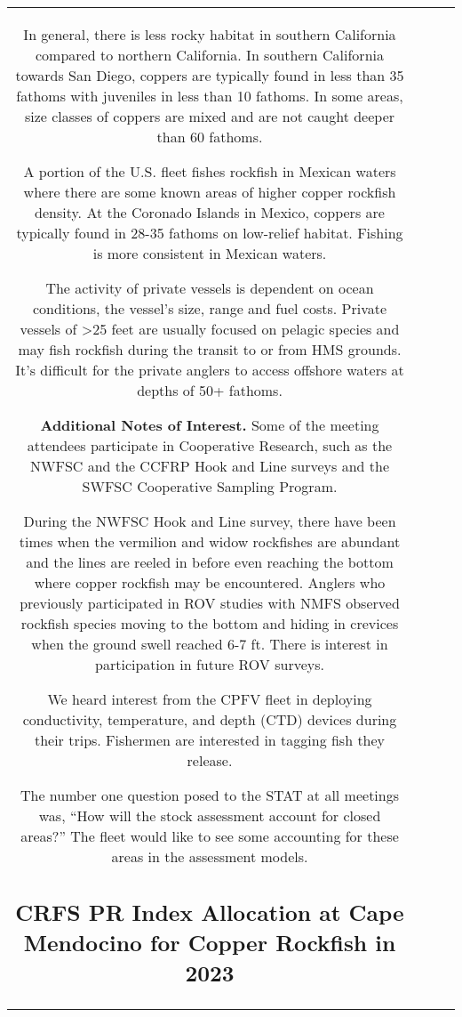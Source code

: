 \documentclass[11pt,
  letterpaper,
]{article}
\begin{document}
\begin{longtable}[t]{c>{\centering\arraybackslash}p{2cm}>{\centering\arraybackslash}p{2cm}>{\centering\arraybackslash}p{2cm}}
In general, there is less rocky habitat in southern California compared to northern California. In southern California towards San Diego, coppers are typically found in less than 35 fathoms with juveniles in less than 10 fathoms. In some areas, size classes of coppers are mixed and are not caught deeper than 60 fathoms.

A portion of the U.S. fleet fishes rockfish in Mexican waters where there are some known areas of higher copper rockfish density. At the Coronado Islands in Mexico, coppers are typically found in 28-35 fathoms on low-relief habitat. Fishing is more consistent in Mexican waters.

The activity of private vessels is dependent on ocean conditions, the vessel's size, range and fuel costs. Private vessels of \textgreater25 feet are usually focused on pelagic species and may fish rockfish during the transit to or from HMS grounds. It's difficult for the private anglers to access offshore waters at depths of 50+ fathoms.

\textbf{Additional Notes of Interest.} Some of the meeting attendees participate in Cooperative Research, such as the NWFSC and the CCFRP Hook and Line surveys and the SWFSC Cooperative Sampling Program.

During the NWFSC Hook and Line survey, there have been times when the vermilion and widow rockfishes are abundant and the lines are reeled in before even reaching the bottom where copper rockfish may be encountered. Anglers who previously participated in ROV studies with NMFS observed rockfish species moving to the bottom and hiding in crevices when the ground swell reached 6-7 ft. There is interest in participation in future ROV surveys.

We heard interest from the CPFV fleet in deploying conductivity, temperature, and depth (CTD) devices during their trips. Fishermen are interested in tagging fish they release.

The number one question posed to the STAT at all meetings was, ``How will the stock assessment account for closed areas?'' The fleet would like to see some accounting for these areas in the assessment models.

\subsection{CRFS PR Index Allocation at Cape Mendocino for Copper Rockfish in 2023}\label{crfs-pr-index-allocation-at-cape-mendocino-for-copper-rockfish-in-2023}


\end{longtable}
\end{document}
